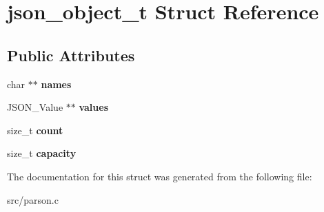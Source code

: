 \hypertarget{structjson__object__t}{\section{json\-\_\-object\-\_\-t Struct Reference}
\label{structjson__object__t}
}
\subsection*{Public Attributes}
\begin{DoxyCompactItemize}
\item 
\hypertarget{structjson__object__t_a476e936d99ecad39e9addb4c56e728aa}{char $\ast$$\ast$ {\bfseries names}}\label{structjson__object__t_a476e936d99ecad39e9addb4c56e728aa}

\item 
\hypertarget{structjson__object__t_a16420d4a051949043d4c6415dfd65811}{J\-S\-O\-N\-\_\-\-Value $\ast$$\ast$ {\bfseries values}}\label{structjson__object__t_a16420d4a051949043d4c6415dfd65811}

\item 
\hypertarget{structjson__object__t_a051459bbcb6abb5482807c06a3c01930}{size\-\_\-t {\bfseries count}}\label{structjson__object__t_a051459bbcb6abb5482807c06a3c01930}

\item 
\hypertarget{structjson__object__t_a4ad2b64ec6d929ced851ff490f82372f}{size\-\_\-t {\bfseries capacity}}\label{structjson__object__t_a4ad2b64ec6d929ced851ff490f82372f}

\end{DoxyCompactItemize}


The documentation for this struct was generated from the following file\-:\begin{DoxyCompactItemize}
\item 
src/parson.\-c\end{DoxyCompactItemize}
